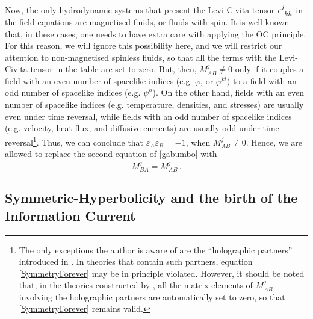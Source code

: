 \documentclass[a4paper, amsfonts, amssymb, amsmath, reprint, showkeys, nofootinbib, twoside, onecolumn,notitlepage]{revtex4-1}
\begin{document}
Now, the only hydrodynamic systems that present the Levi-Civita tensor $\epsilon\indices{^j _k _h}$ in the field equations are magnetised fluids, or fluids with spin. It is well-known that, in these cases, one needs to have extra care with applying the OC principle. For this reason, we will ignore this possibility here, and we will restrict our attention to non-magnetised spinless fluids, so that all the terms with the Levi-Civita tensor in the table are set to zero. But, then, $M^j_{AB} \neq 0$ only if it couples a field with an even number of spacelike indices (e.g. $\varphi$, or $\varphi^{kl}$) to a field with an odd number of spacelike indices (e.g. $\psi^h$). On the other hand, fields with an even number of spacelike indices (e.g. temperature, densities, and stresses) are usually even under time reversal, while fields with an odd number of spacelike indices (e.g. velocity, heat flux, and diffusive currents) are usually odd under time reversal\footnote{The only exceptions the author is aware of are the ``holographic partners'' introduced in \cite{GavassinoNonHydro2022}. In theories that contain such partners, equation \eqref{SymmetryForever} may be in principle violated. However, it should be noted that, in the theories constructed by \citet{GavassinoNonHydro2022}, all the matrix elements of $M^j_{AB}$ involving the holographic partners are automatically set to zero, so that \eqref{SymmetryForever} remains valid.}. Thus, we can conclude that $\varepsilon_A \varepsilon_B =-1$, when $M^j_{AB}\neq 0$. Hence, we are allowed to replace the second equation of \eqref{gabumbo} with
\begin{equation}\label{SymmetryForever}
M^j_{BA}= M^j_{AB} \, .
\end{equation} 

\subsection{Symmetric-Hyperbolicity and the birth of the Information Current}
\end{document}
